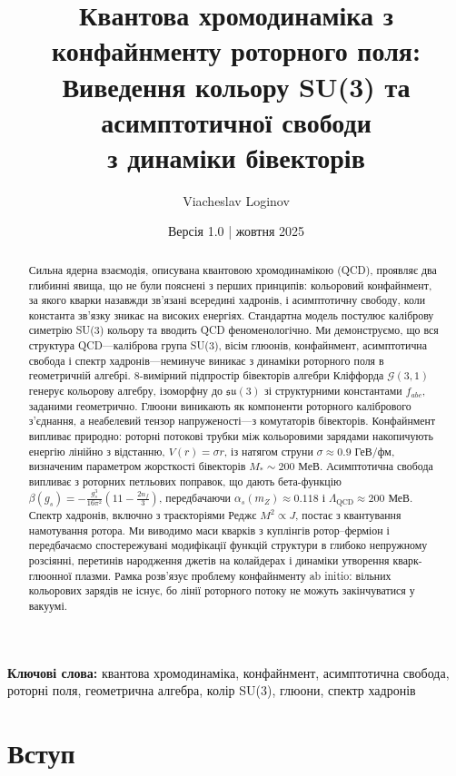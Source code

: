 \documentclass[11pt,a4paper]{article}
\title{\textbf{Квантова хромодинаміка з конфайнменту роторного поля:\\
Виведення кольору SU(3) та асимптотичної свободи\\
з динаміки бівекторів}}
\author[1]{Viacheslav Loginov}
\affil[1]{Київ, Україна\\ \texttt{barthez.slavik@gmail.com}}
\date{\small Версія 1.0 \quad|\quad 15 жовтня 2025}
\newcommand{\Cl}{\mathcal{G}}
\theoremstyle{definition}
\theoremstyle{plain}
\theoremstyle{remark}
\begin{document}
\maketitle

\begin{abstract}
\noindent
Сильна ядерна взаємодія, описувана квантовою хромодинамікою (QCD), проявляє два глибинні явища, що не були пояснені з перших принципів: кольоровий конфайнмент, за якого кварки назавжди зв’язані всередині хадронів, і асимптотичну свободу, коли константа зв’язку зникає на високих енергіях. Стандартна модель постулює каліброву симетрію SU(3) кольору та вводить QCD феноменологічно. Ми демонструємо, що вся структура QCD—каліброва група SU(3), вісім глюонів, конфайнмент, асимптотична свобода і спектр хадронів—неминуче виникає з динаміки роторного поля в геометричній алгебрі. 8-вимірний підпростір бівекторів алгебри Кліффорда $\Cl(3,1)$ генерує кольорову алгебру, ізоморфну до $\mathfrak{su}(3)$ зі структурними константами $f_{abc}$, заданими геометрично. Глюони виникають як компоненти роторного калібрового з’єднання, а неабелевий тензор напруженості—з комутаторів бівекторів. Конфайнмент випливає природно: роторні потокові трубки між кольоровими зарядами накопичують енергію лінійно з відстанню, $V(r)=\sigma r$, із натягом струни $\sigma \approx 0{.}9$ ГеВ/фм, визначеним параметром жорсткості бівекторів $M_\ast \sim 200$ МеВ. Асимптотична свобода випливає з роторних петльових поправок, що дають бета-функцію $\beta(g_s) = -\frac{g_s^3}{16\pi^2}(11 - \frac{2n_f}{3})$, передбачаючи $\alpha_s(m_Z) \approx 0{.}118$ і $\Lambda_{\mathrm{QCD}} \approx 200$ МеВ. Спектр хадронів, включно з траєкторіями Реджє $M^2 \propto J$, постає з квантування намотування ротора. Ми виводимо маси кварків з куплінгів ротор–ферміон і передбачаємо спостережувані модифікації функцій структури в глибоко непружному розсіянні, перетинів народження джетів на колайдерах і динаміки утворення кварк-глюонної плазми. Рамка розв’язує проблему конфайнменту ab initio: вільних кольорових зарядів не існує, бо лінії роторного потоку не можуть закінчуватися у вакуумі.
\end{abstract}

\noindent\textbf{Ключові слова:} квантова хромодинаміка, конфайнмент, асимптотична свобода, роторні поля, геометрична алгебра, колір SU(3), глюони, спектр хадронів

\tableofcontents
\newpage

\section{Вступ}
\label{sec:introduction}
\end{document}
